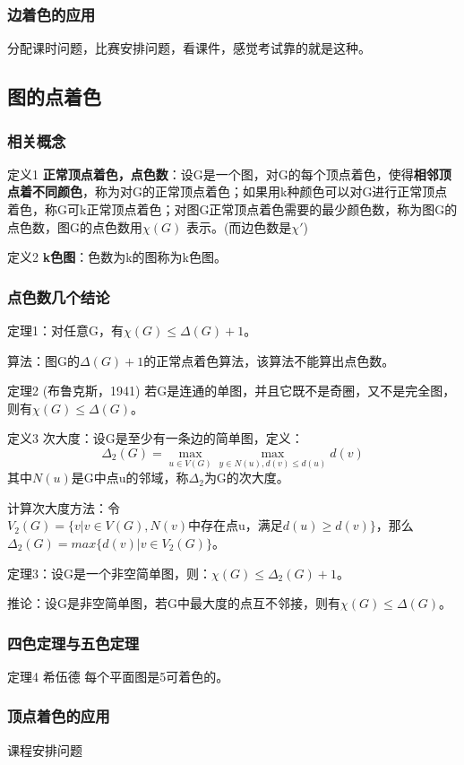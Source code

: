 \documentclass{article}
\begin{document}
\subsubsection{边着色的应用}

分配课时问题，比赛安排问题，看课件，感觉考试靠的就是这种。

\subsection{图的点着色}

\subsubsection{相关概念}

定义1 \textbf{正常顶点着色，点色数}：设G是一个图，对G的每个顶点着色，使得\textbf{相邻顶点着不同颜色}，称为对G的正常顶点着色；如果用k种颜色可以对G进行正常顶点着色，称G可k正常顶点着色；对图G正常顶点着色需要的最少颜色数，称为图G的点色数，图G的点色数用$\chi(G)$ 表示。(而边色数是$\chi'$)

定义2 \textbf{k色图}：色数为k的图称为k色图。

\subsubsection{点色数几个结论}

定理1：对任意G，有$\chi(G) \le \Delta(G) + 1$。

算法：图G的$\Delta(G) + 1$的正常点着色算法，该算法不能算出点色数。

定理2 (布鲁克斯，1941) 若G是连通的单图，并且它既不是奇圈，又不是完全图，则有$\chi(G) \le \Delta(G)$。

定义3 次大度：设G是至少有一条边的简单图，定义：$$\Delta_2(G) = \mathop{max}\limits_{u \in V(G)} \mathop{max}\limits_{y \in N(u), d(v) \le d(u)}  d(v)$$其中$N(u)$是G中点u的邻域，称$\Delta_2$为G的次大度。

计算次大度方法：令$V_2(G) = \{v|v\in V(G), N(v)\text{中存在点u，满足}d(u) \ge d(v)\}$，那么$\Delta_2(G) = max\{d(v) | v \in V_2(G)\}$。

定理3：设G是一个非空简单图，则：$\chi(G) \le \Delta_2(G) + 1$。

推论：设G是非空简单图，若G中最大度的点互不邻接，则有$\chi(G) \le \Delta(G)$。

\subsubsection{四色定理与五色定理}
	
定理4 希伍德 每个平面图是5可着色的。

\subsubsection{顶点着色的应用}

课程安排问题
\end{document}
